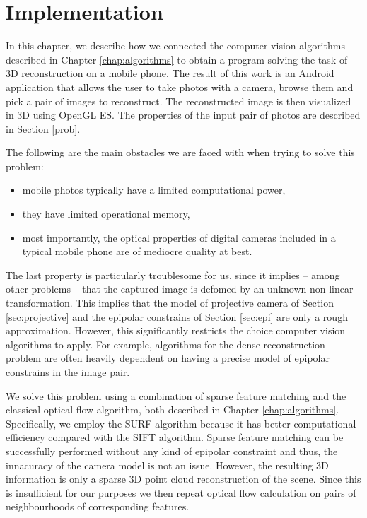 \chapter{Implementation}
\label{chap:implementation}

In this chapter, we describe how we connected the computer vision algorithms described in Chapter \ref{chap:algorithms} to obtain a program solving the task of 3D reconstruction on a mobile phone. 
The result of this work is an Android application that allows the user to take photos with a camera, browse them and pick a pair of images to reconstruct. 
The reconstructed image is then visualized in 3D using OpenGL ES.
The properties of the input pair of photos are described in Section \ref{prob}.

The following are the main obstacles we are faced with when trying to solve this problem: 
\begin{itemize}
\item mobile photos typically have a limited computational power, 
\item they have limited operational memory, 
\item most importantly, the optical properties of digital cameras included in a typical mobile phone are of mediocre quality at best. 
\end{itemize} 
The last property is particularly troublesome for us, since it implies -- among other problems -- that the captured image is defomed by an unknown non-linear transformation. 
This implies that the model of projective camera of Section \ref{sec:projective} and the epipolar constrains of Section \ref{sec:epi} are only a rough approximation. 
However, this significantly restricts the choice computer vision algorithms to apply. 
For example, algorithms for the dense reconstruction problem are often heavily dependent on having a precise model of epipolar constrains in the image pair. 

We solve this problem using a combination of sparse feature matching and the classical optical flow algorithm, both described in Chapter \ref{chap:algorithms}. 
Specifically, we employ the SURF algorithm because it has better computational efficiency compared with the SIFT algorithm.
Sparse feature matching can be successfully performed without any kind of epipolar constraint and thus, the innacuracy of the camera model is not an issue. 
However, the resulting 3D information is only a sparse 3D point cloud reconstruction of the scene. 
Since this is insufficient for our purposes we then repeat optical flow calculation on pairs of neighbourhoods of corresponding features. 

